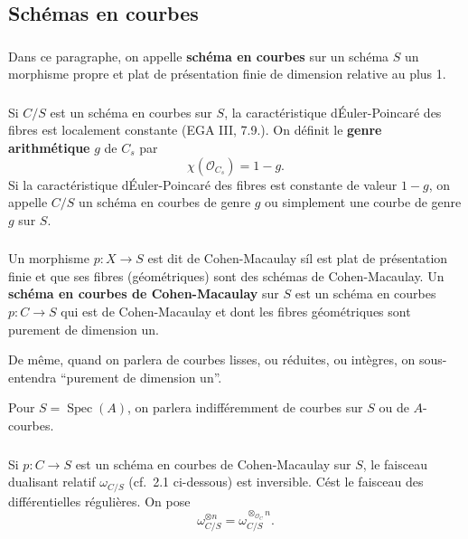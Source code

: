 \documentclass{amsart}
\theoremstyle{plain}
\theoremstyle{remark}
\DeclareMathOperator{\Spec}{Spec}
\newcommand{\cO}{\mathcal{O}}
\begin{document}
\subsection{Sch\'emas en courbes}

\subsubsection{}
Dans ce paragraphe, on appelle \textbf{sch\'ema en courbes} sur un sch\'ema $S$ un
morphisme propre et plat de pr\'esentation finie de dimension relative au plus 1.

\subsubsection{}
Si $C/S$ est un sch\'ema en courbes sur $S$, la caract\'eristique d\'Euler-Poincar\'e des
fibres est localement constante (EGA III, 7.9.). On d\'efinit le \textbf{genre arithm\'etique}
$g$ de $C_s$ par
\[
\chi(\cO_{C_s}) = 1 - g.
\]
Si la caract\'eristique d\'Euler-Poincar\'e des fibres est constante de valeur $1-g$,
on appelle $C/S$ un sch\'ema en courbes de genre $g$ ou simplement une courbe de genre $g$ sur $S$.

\subsubsection{}
Un morphisme $p: X \to S$ est dit de Cohen-Macaulay s\'il est plat de pr\'esentation finie
et que ses fibres (g\'eom\'etriques) sont des sch\'emas de Cohen-Macaulay. Un
\textbf{sch\'ema en courbes de Cohen-Macaulay} sur $S$ est un sch\'ema en courbes
$p: C \to S$ qui est de Cohen-Macaulay et dont les fibres g\'eom\'etriques sont purement
de dimension un.

De m\^eme, quand on parlera de courbes lisses, ou r\'eduites, ou int\`egres,
on sous-entendra ``purement de dimension un''.

Pour $S = \Spec(A)$, on parlera indiff\'eremment de courbes sur $S$ ou de $A$-courbes.

\subsubsection{}
Si $p: C \to S$ est un sch\'ema en courbes de Cohen-Macaulay sur $S$, le faisceau
dualisant relatif $\omega_{C/S}$ (cf.~2.1 ci-dessous) est inversible. C\'est le faisceau des
diff\'erentielles r\'eguli\`eres. On pose
\[
\omega_{C/S}^{\otimes n} = \omega_{C/S}^{\otimes_{\cO_C} n}.
\]
\end{document}
